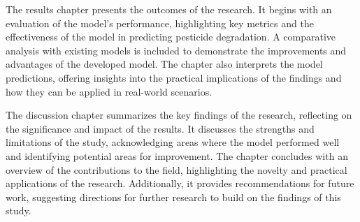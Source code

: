 The results chapter presents the outcomes of the research. It begins with an evaluation of the model's performance, highlighting key metrics and the effectiveness of the model in predicting pesticide degradation. A comparative analysis with existing models is included to demonstrate the improvements and advantages of the developed model. The chapter also interprets the model predictions, offering insights into the practical implications of the findings and how they can be applied in real-world scenarios.

The discussion chapter summarizes the key findings of the research, reflecting on the significance and impact of the results. It discusses the strengths and limitations of the study, acknowledging areas where the model performed well and identifying potential areas for improvement. The chapter concludes with an overview of the contributions to the field, highlighting the novelty and practical applications of the research. Additionally, it provides recommendations for future work, suggesting directions for further research to build on the findings of this study.